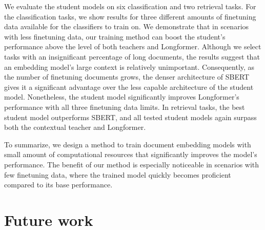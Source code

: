We evaluate the student models on six classification and two retrieval tasks.
For the classification tasks, we show results for three different amounts of
finetuning data available for the classifiers to train on. We demonstrate that
in scenarios with less finetuning data, our training method can boost the
student's performance above the level of both teachers and Longformer. Although
we select tasks with an insignificant percentage of long documents, the results
suggest that an embedding model's large context is relatively unimportant.
Consequently, as the number of finetuning documents grows, the denser
architecture of SBERT gives it a significant advantage over the less capable
architecture of the student model. Nonetheless, the student model significantly
improves Longformer's performance with all three finetuning data limits. In
retrieval tasks, the best student model outperforms SBERT, and all tested
student models again surpass both the contextual teacher and Longformer.

To summarize, we design a method to train document embedding models with small
amount of computational resources that significantly improves the model's
performance. The benefit of our method is especially noticeable in scenarios
with few finetuning data, where the trained model quickly becomes proficient
compared to its base performance.


\section*{Future work}

